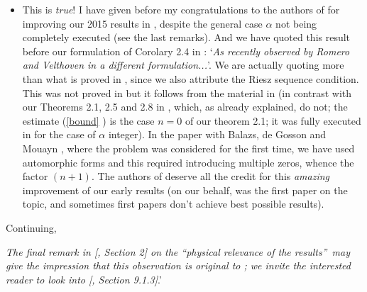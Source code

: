 \documentclass[11pt,reqno]{amsart}
\numberwithin{equation}{section}
\theoremstyle{plain}
\theoremstyle{definition}
\theoremstyle{remark}
\begin{document}
\begin{itemize}
\item This is \emph{true}! I have given before my congratulations to the
authors of \cite{Jordi} for improving our 2015 results in \cite{AoP},
despite the general case $\alpha $ not being completely executed (see the
last remarks). And we have quoted this result before our formulation of
Corolary 2.4 in \cite{Affine}: `\emph{As recently observed by Romero and
Velthoven in a different formulation...}'. We are actually quoting more than
what is proved in \cite{Jordi}, since we also attribute the Riesz sequence
condition. This was not proved in \cite{Jordi} but it follows from the
material in \cite{Jordi} (in contrast with our Theorems 2.1, 2.5 and 2.8 in 
\cite{Affine}, which, as already explained, do not; the estimate (\ref{bound}%
) is the case $n=0$ of our theorem 2.1; it was fully executed in \cite{Jordi}
for the case of $\alpha $ integer). In the paper with Balazs, de Gosson and
Mouayn \cite{AoP}, where the problem was considered for the first time, we
have used automorphic forms and this required introducing multiple zeros,
whence the factor $(n+1)$. The authors of \cite{Jordi} deserve all the
credit for this \emph{amazing} improvement of our early results (on our
behalf, \cite{AoP} was the first paper on the topic, and sometimes first
papers don't achieve best possible results).
\end{itemize}

\begin{equation*}
\end{equation*}%
Continuing,%
\begin{equation*}
\end{equation*}

\emph{The final remark in [\cite{Affine}, Section 2] on the
\textquotedblleft physical relevance of the results\textquotedblright\ may
give the impression that this observation is original to \cite{Affine}; we
invite the interested reader to look into [\cite{Jordi}, Section 9.1.3]}.'%
\begin{equation*}
\end{equation*}
\end{document}
